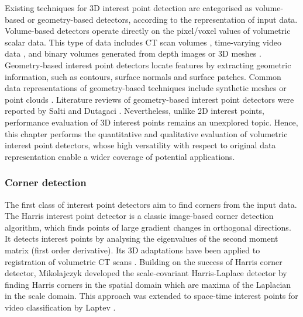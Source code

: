Existing techniques for 3D interest point detection are categorised as volume-based or geometry-based detectors, according to the representation of input data. Volume-based detectors operate directly on the pixel/voxel values of volumetric scalar data. This type of data includes CT scan volumes \cite{Flitton2010}, time-varying video data \cite{Koelstra2009, Laptev2005, Willems2008, Yu2010}, and binary volumes generated from depth images \cite{Hadfield2013} or 3D meshes \cite{Viksten2008, Knopp2010}.  
Geometry-based interest point detectors locate features by extracting geometric information, such as contours, surface normals and surface patches. 
Common data representations of geometry-based techniques include synthetic meshes \cite{Glomb2009,Sipiran2011,Zaharescu2009} or point clouds \cite{Unnikrishnan2008,Aanaes2012}. 
Literature reviews of geometry-based interest point detectors were reported by Salti \etal \cite{Salti2011} and Dutagaci \etal \cite{Dutagaci2011}.  
Nevertheless, unlike 2D interest points, performance evaluation of 3D interest points remains an unexplored topic. 
Hence, this chapter performs the quantitative and qualitative evaluation of volumetric interest point detectors, whose high versatility with respect to original data representation enable a wider coverage of potential applications.


\subsubsection{Corner detection}
The first class of interest point detectors aim to find corners from the input data.
The Harris interest point detector \cite{Harris1988} is a classic image-based corner detection algorithm, which finds points of large gradient changes in orthogonal directions. It detects interest points by analysing the eigenvalues of the second moment matrix (first order derivative). Its 3D adaptations have been applied to registration of volumetric CT scans \cite{Ruiz-Alzola2001, Dalvi2010}.  
Building on the success of Harris corner detector, Mikolajczyk \cite{Mikolajczyk2004} developed the scale-covariant Harris-Laplace detector by finding Harris corners in the spatial domain which are maxima of the Laplacian in the scale domain. 
This approach was extended to space-time interest points for video classification by Laptev \cite{Laptev2005}. 

